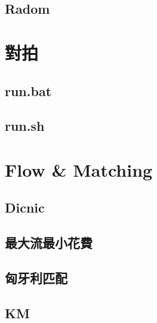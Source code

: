 \subsection{Radom}



\section{對拍}

\subsection{run.bat}


\subsection{run.sh}

\section{Flow \& Matching}

\subsection{Dicnic}


\subsection{最大流最小花費}


\subsection{匈牙利匹配}


\subsection{KM}


